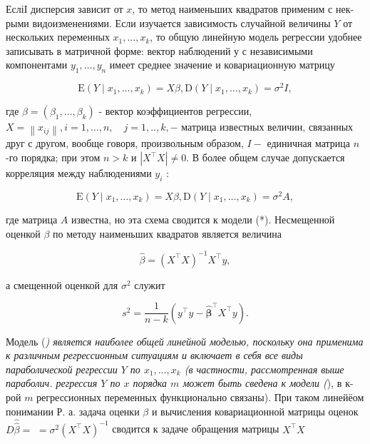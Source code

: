 \documentclass[10pt]{article}
\begin{document}
ЕсліІ дисперсия зависит от $x$, то метод наименьших квадратов применим с нек-рыми видоизменениями. Если изучается зависимость случайной величины $Y$ от нескольких переменных $x_{1}, \ldots, x_{k}$, то общую линейную модель регрессии удобнее записывать в матричной форме: вектор наблюдений $у$ с независимыми компонентами $y_{1}, \ldots, y_{n}$ имеет среднее значение и ковариационную матрицу



\[

\mathrm{E}\left(Y \mid x_{1}, \ldots, x_{k}\right)=X \beta, \mathrm{D}\left(Y \mid x_{1}, \ldots, x_{k}\right)=\sigma^{2} I,

\]



где $\beta=\left(\beta_{1}, \ldots, \beta_{k}\right)$ - вектор коэффициентов регрессии, $X=\left\|x_{i j}\right\|, i=1, \ldots, n, \quad j=1, . ., k,-$ матрица известных величин, связанных друг с другом, вообще говоря, произвольным образом, $I-$ единичная матрица $n$-го порядка; при этом $n>k$ и $\left|X^{\top} X\right| \neq 0$. В более общем случае допускается корреляция между наблюдениями $y_{i}$ :



\[

\mathrm{E}\left(Y \mid x_{1}, \ldots, x_{k}\right)=X \beta, \mathrm{D}\left(Y \mid x_{1}, \ldots, x_{k}\right)=\sigma^{2} A,

\]



где матрица $A$ известна, но эта схема сводится к модели (*). Несмещенной оценкой $\beta$ по методу наименьших квадратов является величина



\[

\hat{\beta}=\left(X^{\top} X\right)^{-1} X^{\top} y,

\]



а смещенной оценкой для $\sigma^{2}$ служит



\[

s^{2}=\frac{1}{n-k}\left(y^{\top} y-\hat{\boldsymbol{\beta}}^{\top} X^{\top} y\right) .

\]



Модель (\textit{) является наиболее общей линейной моделью, поскольку она применима к различным регрессионным ситуациям и включает в себя все виды параболической регрессии $Y$ по $x_{1}, \ldots, x_{k}$ (в частности, рассмотренная выше параболич. регрессия $Y$ по $x$ порядка $m$ может быть сведена к модели (}), в к-рой $m$ регрессионных переменных функционально связаны). При таком линейёом понимании Р. а. задача оценки $\beta$ и вычисления ковариационной матрицы оценок $D \widehat{\hat{\beta}}=$ $=\sigma^{2}\left(X^{\top} X\right)^{-1}$ сводится к задаче обращения матрицы $X^{\top} X$
\end{document}
